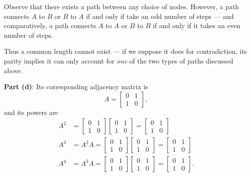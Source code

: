 \documentclass[11pt]{article}
\begin{document}
\qquad \qquad \qquad {}

Observe that there exists a path between any choice of nodes. However, a path connects $A$ to $B$ or $B$ to $A$ if and only if take an odd number of steps --- and comparatively, a path connects $A$ to $A$ or $B$ to $B$ if and only if it takes an even number of steps.

Thus a common length cannot exist --- if we suppose it does for contradiction, its parity implies it can only account for \textit{one} of the two types of paths discussed above.

\textbf{Part (d)}: Its corresponding adjacency matrix is
\[
	A = \begin{bmatrix} 0 & 1 \\ 1 & 0 \end{bmatrix},
\]
and its powers are
\begin{align*}
	A^{2} &= \begin{bmatrix} 0 & 1 \\ 1 & 0 \end{bmatrix} \begin{bmatrix} 0 & 1 \\ 1 & 0 \end{bmatrix} = \begin{bmatrix} 0 & 1 \\ 1 & 0 \end{bmatrix} \\
	A^{3} &= A^{2} A = \begin{bmatrix} 0 & 1 \\ 1 & 0 \end{bmatrix} \begin{bmatrix} 0 & 1 \\ 1 & 0 \end{bmatrix} = \begin{bmatrix} 0 & 1 \\ 1 & 0 \end{bmatrix} \\
	A^{4} &= A^{3}A = \begin{bmatrix} 0 & 1 \\ 1 & 0 \end{bmatrix} \begin{bmatrix} 0 & 1 \\ 1 & 0 \end{bmatrix} = \begin{bmatrix} 0 & 1 \\ 1 & 0 \end{bmatrix}.
\end{align*}
\end{document}
